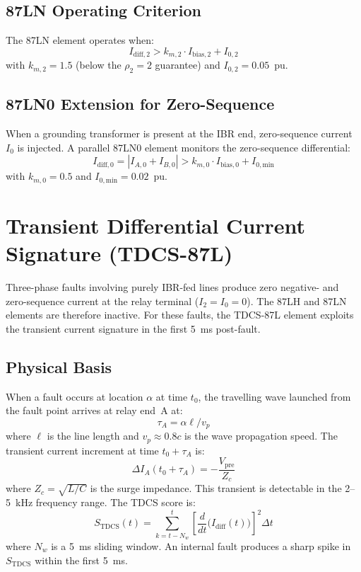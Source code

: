\subsection{87LN Operating Criterion}

The 87LN element operates when:
\begin{equation}
  I_\mathrm{diff,2} > k_{m,2} \cdot I_\mathrm{bias,2} + I_{0,2}
  \label{eq:ch4_87ln_criterion}
\end{equation}
with $k_{m,2} = 1.5$ (below the $\rho_2 = 2$ guarantee) and $I_{0,2} = 0.05$~pu.

\subsection{87LN0 Extension for Zero-Sequence}

When a grounding transformer is present at the IBR end, zero-sequence
current $I_0$ is injected. A parallel 87LN0 element monitors the
zero-sequence differential:
\begin{equation}
  I_\mathrm{diff,0} = |I_{A,0} + I_{B,0}|
    > k_{m,0} \cdot I_\mathrm{bias,0} + I_{0,\mathrm{min}}
  \label{eq:ch4_87ln0_criterion}
\end{equation}
with $k_{m,0} = 0.5$ and $I_{0,\mathrm{min}} = 0.02$~pu.

\section{Transient Differential Current Signature (TDCS-87L)}
\label{sec:ch4_tdcs}

Three-phase faults involving purely IBR-fed lines produce zero
negative- and zero-sequence current at the relay terminal
($I_2 = I_0 = 0$). The 87LH and 87LN elements are therefore inactive.
For these faults, the TDCS-87L element exploits the transient current
signature in the first 5~ms post-fault.

\subsection{Physical Basis}

When a fault occurs at location $\alpha$ at time $t_0$, the travelling
wave launched from the fault point arrives at relay end~A at:
\begin{equation}
  \tau_A = \alpha \ell / v_p
  \label{eq:ch4_tdcs_tau}
\end{equation}
where $\ell$ is the line length and $v_p \approx 0.8c$ is the wave
propagation speed. The transient current increment at time $t_0 + \tau_A$
is:
\begin{equation}
  \Delta I_A(t_0 + \tau_A) = -\frac{V_\mathrm{pre}}{Z_c}
  \label{eq:ch4_tdcs_di}
\end{equation}
where $Z_c = \sqrt{L/C}$ is the surge impedance. This transient is
detectable in the 2--5~kHz frequency range. The TDCS score is:
\begin{equation}
  S_\mathrm{TDCS}(t) = \sum_{k=t-N_w}^{t}
  \left[\frac{d}{dt}\bigl(I_\mathrm{diff}(t)\bigr)\right]^2 \Delta t
  \label{eq:ch4_tdcs_score}
\end{equation}
where $N_w$ is a 5~ms sliding window. An internal fault produces a sharp
spike in $S_\mathrm{TDCS}$ within the first 5~ms.

